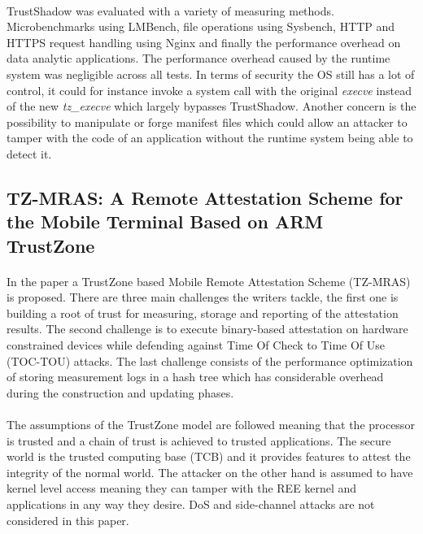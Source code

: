 \paragraph*{}
TrustShadow was evaluated with a variety of measuring methods. Microbenchmarks using LMBench, file operations using Sysbench, HTTP and HTTPS request handling using Nginx and finally the performance overhead on data analytic applications. The performance overhead caused by the runtime system was negligible across all tests. In terms of security the OS still has a lot of control, it could for instance invoke a system call with the original \textit{execve} instead of the new \textit{tz\_execve} which largely bypasses TrustShadow. Another concern is the possibility to manipulate or forge manifest files which could allow an attacker to tamper with the code of an application without the runtime system being able to detect it. 

\subsection*{TZ-MRAS: A Remote Attestation Scheme for the Mobile Terminal Based on ARM TrustZone}  

\paragraph*{}
In the paper \cite{WangZiwang2020TARA} a TrustZone based Mobile Remote Attestation Scheme (TZ-MRAS) is proposed. There are three main challenges the writers tackle, the first one is building a root of trust for measuring, storage and reporting of the attestation results. The second challenge is to execute binary-based attestation on hardware constrained devices while defending against Time Of Check to Time Of Use (TOC-TOU) attacks. The last challenge consists of the performance optimization of storing measurement logs in a hash tree which has considerable overhead during the construction and updating phases. 

\paragraph*{}
The assumptions of the TrustZone model are followed meaning that the processor is trusted and a chain of trust is achieved to trusted applications. The secure world is the trusted computing base (TCB) and it provides features to attest the integrity of the normal world. The attacker on the other hand is assumed to have kernel level access meaning they can tamper with the REE kernel and applications in any way they desire. DoS and side-channel attacks are not considered in this paper.

